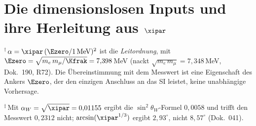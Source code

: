 \section{Die dimensionslosen Inputs und ihre Herleitung aus $\xipar$}

\begin{table}[htbp]
  \centering
  \caption{Die überlebenden dimensionslosen Inputs der Physik und ihre
           Herleitung aus dem einzigen Parameter $\xipar=\tfrac{4}{3}\times10^{-4}$.
           Sämtliche Relationen quellenbelegt.}
  \label{tab:xi-inputs}
  {\footnotesize\setlength{\tabcolsep}{4pt}
  }

  \medskip
  \footnotesize
  $^{\dagger}$\,$\alpha=\xipar\,(\Ezero/1\,\mathrm{MeV})^2$ ist die \emph{Leitordnung},
  mit $\Ezero=\sqrt{m_e\,m_\mu/\Kfrak}=7{,}398$\,MeV (nackt $\sqrt{m_e\,m_\mu}=7{,}348$\,MeV, Dok.~190, R72). Die Übereinstimmung mit dem Messwert ist eine Eigenschaft des Ankers $\Ezero$, der den einzigen Anschluss an das SI leistet, keine unabhängige Vorhersage.\par
  $^{\ddagger}$\,Mit $\alpha_W = \sqrt{\xipar} = 0{,}01155$ ergibt die $\sin^2\theta_W$-Formel $0{,}0058$ und trifft den Messwert $0{,}2312$ nicht; $\arcsin(\xipar^{1/3})$ ergibt $2{,}93^\circ$, nicht $8{,}57^\circ$ (Dok.~041).
 

\end{table}
